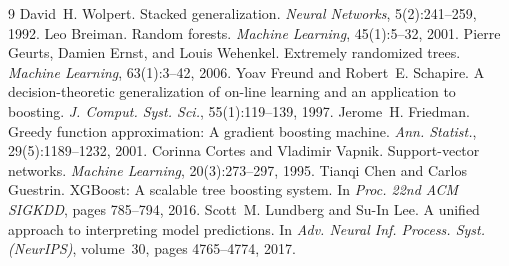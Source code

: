 \documentclass{article}
\begin{document}
\begin{thebibliography}{9}
David~H. Wolpert. Stacked generalization. \emph{Neural Networks}, 5(2):241--259, 1992.
Leo Breiman. Random forests. \emph{Machine Learning}, 45(1):5--32, 2001.
Pierre Geurts, Damien Ernst, and Louis Wehenkel. Extremely randomized trees. \emph{Machine Learning}, 63(1):3--42, 2006.
Yoav Freund and Robert~E. Schapire. A decision-theoretic generalization of on-line learning and an application to boosting. \emph{J. Comput. Syst. Sci.}, 55(1):119--139, 1997.
Jerome~H. Friedman. Greedy function approximation: A gradient boosting machine. \emph{Ann. Statist.}, 29(5):1189--1232, 2001.
Corinna Cortes and Vladimir Vapnik. Support-vector networks. \emph{Machine Learning}, 20(3):273--297, 1995.
Tianqi Chen and Carlos Guestrin. {XGBoost}: A scalable tree boosting system. In \emph{Proc. 22nd ACM SIGKDD}, pages 785--794, 2016.
Scott~M. Lundberg and Su-In Lee. A unified approach to interpreting model predictions. In \emph{Adv. Neural Inf. Process. Syst. (NeurIPS)}, volume~30, pages 4765--4774, 2017.
\end{thebibliography}
\end{document}
